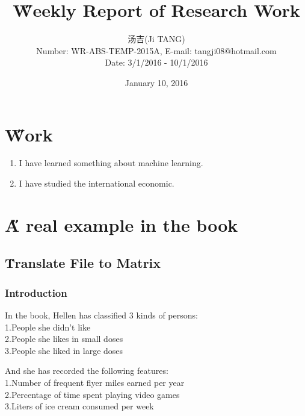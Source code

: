 \documentclass[12pt]{article}
\title{{\H Weekly Report of Research Work\\ }\quad {WR-ABS-TEMP-2015A-No.007}}
\author{汤吉(Ji TANG)\\
               Number: WR-ABS-TEMP-2015A,  E-mail: tangji08@hotmail.com \\
        Date: 3/1/2016 - 10/1/2016}
\date{January 10, 2016}
\begin{document}
  
\maketitle
\pagestyle{fancy}
\fancyhead[LO,RE]{\leftmark} %



\renewcommand{\headrulewidth}{0.4pt}
\renewcommand{\footrulewidth}{0.4pt}



\tableofcontents 
\newpage
\section{\H Work}
\begin{enumerate}
	\item I have learned something about machine learning.
	\item I have studied the international economic.
\end{enumerate}

\section{\H A real example in the book}
\subsection{\H Translate File to Matrix}
\subsubsection{Introduction}
In the book, Hellen has classified 3 kinds of persons:\\1.People she didn't like\\2.People she likes in small doses\\3.People she liked in large doses

And she has recorded the following features:\\1.Number of frequent flyer miles earned per year\\2.Percentage of time spent playing video games\\3.Liters of ice cream consumed per week
\end{document}
